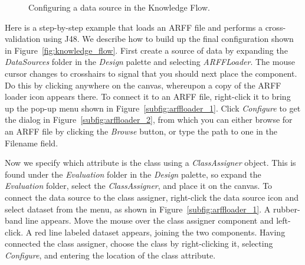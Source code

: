 \begin{figure}[!th]
\centering
{}
\qquad
{}
\caption{\label{fig:kf_arffloader}Configuring a data source in the Knowledge Flow.}
\end{figure}

Here is a step-by-step example that loads an ARFF file and performs a
cross-validation using J48. We describe how to build up the final
configuration shown in Figure~\ref{fig:knowledge_flow}. First create a
source of data by expanding the \textit{DataSources} folder in
the \textit{Design} palette and selecting \textit{ARFFLoader}. The
mouse cursor changes to crosshairs to signal that you should next
place the component. Do this by clicking anywhere on the canvas,
whereupon a copy of the ARFF loader icon appears there. To connect it
to an ARFF file, right-click it to bring up the pop-up menu shown in
Figure~\ref{subfig:arffloader_1}. Click \textit{Configure} to get the
dialog in Figure~\ref{subfig:arffloader_2}, from which you can either
browse for an ARFF file by clicking the \textit{Browse} button, or
type the path to one in the Filename field.

Now we specify which attribute is the class using
a \textit{ClassAssigner} object. This is found under
the \textit{Evaluation} folder in the \textit{Design} palette, so
expand the \textit{Evaluation} folder, select
the \textit{ClassAssigner}, and place it on the canvas. To connect the
data source to the class assigner, right-click the data source icon
and select dataset from the menu, as shown in
Figure~\ref{subfig:arffloader_1}. A rubber-band line appears. Move the
mouse over the class assigner component and left-click. A red line
labeled dataset appears, joining the two components. Having connected
the class assigner, choose the class by right-clicking it, selecting
\textit{Configure}, and entering the location of the class attribute.

